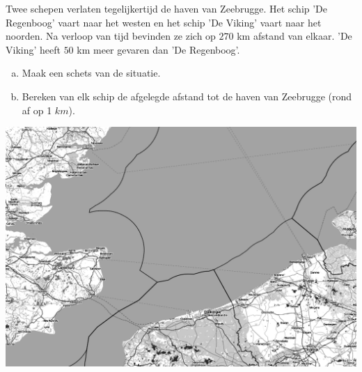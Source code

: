 \documentclass[12pt]{article}
\begin{document}
\begin{oefening}
Twee schepen verlaten tegelijkertijd de haven van Zeebrugge. Het schip 'De Regenboog' vaart naar het westen en het schip 'De Viking' vaart naar het noorden. Na verloop van tijd bevinden ze zich op $270$ km afstand van elkaar. 'De Viking' heeft $50$ km meer gevaren dan 'De Regenboog'.
\begin{enumerate}[(a)]
  \item Maak een schets van de situatie.
  \item Bereken van elk schip de afgelegde afstand tot de haven van Zeebrugge (rond af op 1 $km$).
\end{enumerate}
\begin{center}
\includegraphics[width=\textwidth]{zeebrugge}
\end{center}
\end{oefening}
\end{document}
